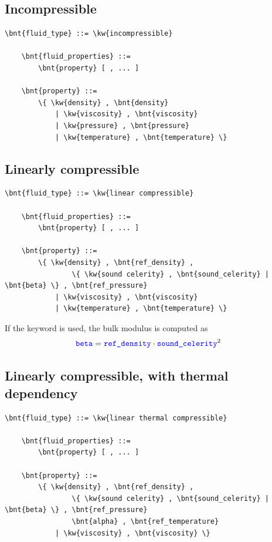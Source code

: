 \subsection{Incompressible}
\begin{Verbatim}[commandchars=\\\{\}]
    \bnt{fluid_type} ::= \kw{incompressible}

    \bnt{fluid_properties} ::=
        \bnt{property} [ , ... ]

    \bnt{property} ::=
        \{ \kw{density} , \bnt{density}
            | \kw{viscosity} , \bnt{viscosity}
            | \kw{pressure} , \bnt{pressure}
            | \kw{temperature} , \bnt{temperature} \}
\end{Verbatim}

\subsection{Linearly compressible}
\begin{Verbatim}[commandchars=\\\{\}]
    \bnt{fluid_type} ::= \kw{linear compressible}

    \bnt{fluid_properties} ::=
        \bnt{property} [ , ... ]

    \bnt{property} ::=
        \{ \kw{density} , \bnt{ref_density} ,
                \{ \kw{sound celerity} , \bnt{sound_celerity} | \bnt{beta} \} , \bnt{ref_pressure}
            | \kw{viscosity} , \bnt{viscosity}
            | \kw{temperature} , \bnt{temperature} \}
\end{Verbatim}
If the keyword  is used, the bulk modulus 
is computed as
\begin{align}
	\textcolor{blue}{\texttt{beta}}
	&=
	\textcolor{blue}{\texttt{ref\_density}} \cdot \textcolor{blue}{\texttt{sound\_celerity}}^2
\end{align}

\subsection{Linearly compressible, with thermal dependency}
\begin{Verbatim}[commandchars=\\\{\}]
    \bnt{fluid_type} ::= \kw{linear thermal compressible}

    \bnt{fluid_properties} ::= 
        \bnt{property} [ , ... ]

    \bnt{property} ::=
        \{ \kw{density} , \bnt{ref_density} ,
                \{ \kw{sound celerity} , \bnt{sound_celerity} | \bnt{beta} \} , \bnt{ref_pressure}
                \bnt{alpha} , \bnt{ref_temperature}
            | \kw{viscosity} , \bnt{viscosity} \}
\end{Verbatim}

